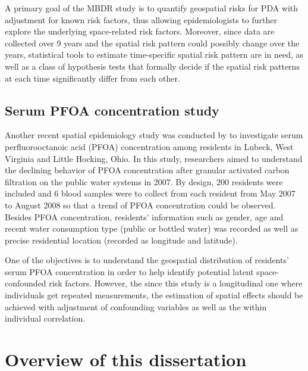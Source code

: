 A primary goal of the MBDR study is to quantify geospatial risks for PDA with adjustment for known risk factors, thus allowing epidemiologists to further explore the underlying space-related risk factors. Moreover, since data are collected over 9 years and the spatial risk pattern could possibly change over the years, statistical tools to estimate time-specific spatial risk pattern are in need, as well as a class of hypothesis tests that formally decide if the spatial risk patterns at each time significantly differ from each other. 

\subsection{Serum PFOA concentration study}

Another recent spatial epidemiology study was conducted by \citet{bartell2010rate} to investigate serum perfluorooctanoic acid (PFOA) concentration among residents in Lubeck, West Virginia and Little Hocking, Ohio. In this study, researchers aimed to understand the declining behavior of PFOA concentration after granular activated carbon filtration on the public water systems in 2007. By design, 200 residents were included and 6 blood samples were to collect from each resident from May 2007 to August 2008 so that a trend of PFOA concentration could be observed. Besides PFOA concentration, residents' information such as gender, age and recent water consumption type (public or bottled water) was recorded as well as precise residential location (recorded as longitude and latitude). 

One of the objectives is to understand the geospatial distribution of residents' serum PFOA concentration in order to help identify potential latent space-confounded risk factors. However, the since this study is a longitudinal one where individuals get repeated measurements, the estimation of spatial effects should be achieved with adjustment of confounding variables as well as the within individual correlation.

\section{Overview of this dissertation}

